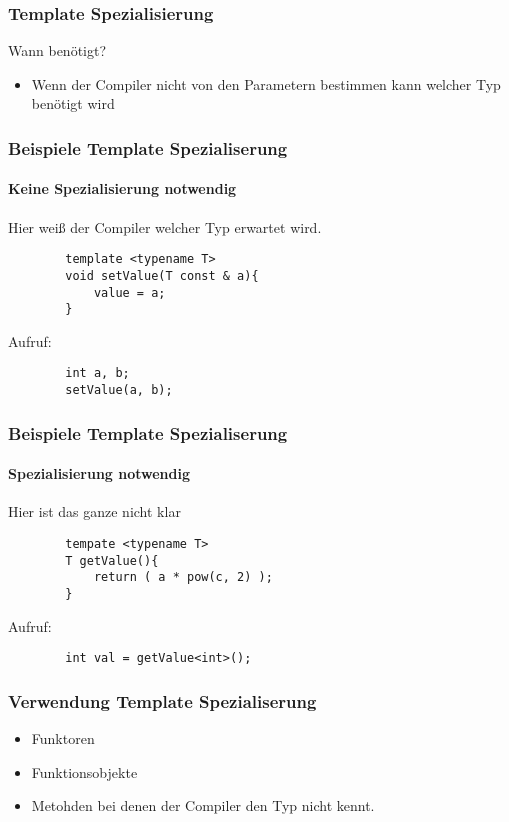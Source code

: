 \documentclass{beamer}
\begin{document}
\begin{frame}[<+->]\frametitle{Template Spezialisierung}
    \pause
    Wann benötigt?
    \pause
    \begin{itemize}
    	\item Wenn der Compiler nicht von den Parametern bestimmen kann welcher Typ benötigt wird
    \end{itemize}
\end{frame}

\begin{frame}[fragile]\frametitle{Beispiele Template Spezialiserung}
	\framesubtitle{Keine Spezialisierung notwendig}
	\pause    
    Hier weiß der Compiler welcher Typ erwartet wird.
    \begin{lstlisting}
		template <typename T>
		void setValue(T const & a){
			value = a;
		}
    \end{lstlisting}

    \pause
    Aufruf:
    \begin{lstlisting}
		int a, b;
		setValue(a, b);
    \end{lstlisting}
\end{frame}

\begin{frame}[fragile]\frametitle{Beispiele Template Spezialiserung}
	\framesubtitle{Spezialisierung notwendig}
    \pause
    Hier ist das ganze nicht klar
    \begin{lstlisting}
		tempate <typename T>
		T getValue(){
			return ( a * pow(c, 2) );
		}
    \end{lstlisting}

    \pause
    Aufruf:
    \begin{lstlisting}
		int val = getValue<int>();
    \end{lstlisting}
\end{frame}

\begin{frame}[<+->]\frametitle{Verwendung Template Spezialiserung}
    \begin{itemize}
    	\item Funktoren
    	\item Funktionsobjekte
    	\item Metohden bei denen der Compiler den Typ nicht kennt.
    \end{itemize}


\end{frame}
\end{document}
